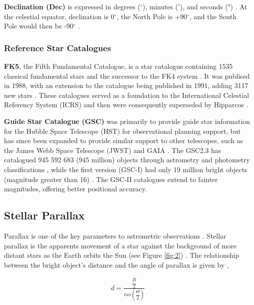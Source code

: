 \documentclass[12pt]{article}
\begin{document}
\textbf{Declination (Dec)} is expressed in degrees ($^{\circ}$), minutes ('), and seconds (") \cite{doody2001basics}. At the celestial equator, declination is 0$^{\circ}$, the North Pole is +90$^{\circ}$, and the South Pole would then be -90$^{\circ}$ \cite{doody2001basics}.

\subsubsection{Reference Star Catalogues}

\textbf{FK5}, the Fifth Fundamental Catalogue, is a star catalogue containing 1535 classical fundamental stars and the successor to the FK4 system \cite{warren1990fifth}. It was publised in 1988, with an extension to the catalogue being published in 1991, adding 3117 new stars \cite{lattanzi1993fk5}. These catalogues served as a foundation to the International
Celestial Referency System (ICRS) and then were consequently superseded by Hipparcos \cite{wielensixth}. 

\textbf{Guide Star Catalogue (GSC)} was primarily to provide guide star information for the Hubble Space Telescope (HST) for observational planning support, but has since been expanded to provide similar support to other telescopes, such as the James Webb Space Telescope (JWST) and GAIA \cite{lasker2008second}.
The GSC2.3 has catalogued 945 592 683 (945 million) objects through astrometry and photometry classifications \cite{lasker2008second}, while the first version (GSC-I) had only 19 million bright objects (magnitude greater than 16) \cite{hstgsc}. The GSC-II catalogues extend to fainter magnitudes, offering better positional accuracy.

\subsection{Stellar Parallax} \label{sec:1.3}

Parallax is one of the key parameters to astrometric observations \cite{luri2018gaia}.
Stellar parallax is the apparents movement of a star against the background of more distant stars as the Earth orbits the Sun (see Figure \ref{fig:2}) \cite{esaparallax,lcoparallax,britparallax}. 
The relationship between the bright object's distance and the angle of parallax is given by \cite{lcoparallax},

\vspace{-2ex}
\begin{gather*}
    d = \frac{\dfrac{B}{2}}{tan\left(\dfrac{\Theta}{2}\right)}
\end{gather*}
\end{document}
